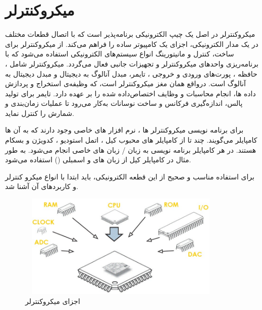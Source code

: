 \newpage
\section{میکروکنترلر}

میکروکنترلر
\unskip{} 
در اصل یک چیپ الکترونیکی برنامه‌پذیر است که با اتصال قطعات مختلف در یک مدار الکترونیکی، اجزای یک کامپیوتر ساده را فراهم می‌کند. از میکروکنترلر برای ساخت، کنترل و مانیتورینگ انواع سیستم‌های الکترونیکی استفاده می‌شود که با برنامه‌ریزی واحدهای میکروکنترلر و تجهیزات جانبی فعال می‌گردد. میکروکنترلر شامل
، حافظه
، پورت‌های ورودی و خروجی
، تایمر، مبدل آنالوگ به دیجیتال
\unskip{}
و مبدل دیجیتال به آنالوگ
\unskip{}
است.
درواقع همان مغز میکروکنترلر است، که وظیفه‌ی استخراج و پردازش داده ها، انجام محاسبات و وظایف اختصاص­‌داده شده را بر عهده دارد. تایمر برای تولید پالس، اندازه­‌گیری فرکانس و ساخت نوسانات به‌کار می‌رود تا عملیات زمان‌بندی و شمارش را کنترل نماید.

برای برنامه نویسی میکروکنترلر ها ، نرم افزار های خاصی وجود دارند که به آن ها کامپایلر
\unskip{}
می‌گویند. چند تا از کامپایلر های محبوب کیل ، اتمل استودیو ، کدویژن  و بسکام  هستند. 
در هر کامپایلر برنامه نویسی به زبان / زبان های خاصی انجام می‌شود. به طور مثال در کامپایلر کیل از زبان های  و اسمبلی () استفاده می‌شود\cite{Electronics}.


برای استفاده مناسب و صحیح از این قطعه الکترونیکی، باید ابتدا با انواع میکرو کنترلر و کاربردهای آن آشنا شد.

    \begin{figure}[!h]
	\centering
	\includegraphics[height=5cm,width=10cm]{./Images/CH3/Micro_Parts.jpg}
	\caption[اجزای میکروکنترلر]{اجزای میکروکنترلر\cite{Micro}}
	\label{اجزا میکرو}
	\end{figure}

\newpage	
